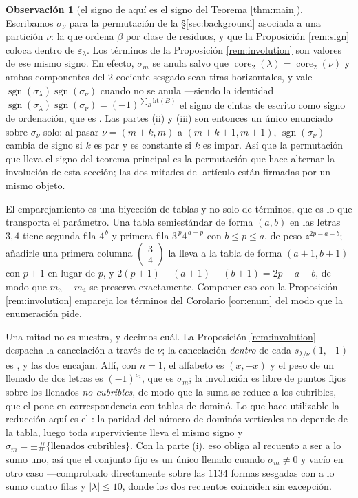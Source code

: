 \documentclass[11pt,reqno]{amsart}
\theoremstyle{plain}
\theoremstyle{definition}
\newtheorem{remark}[theorem]{Observación}
\newcommand{\sgn}{\operatorname{sgn}}
\newcommand{\core}{\operatorname{core}}
\begin{document}
\begin{remark}[el signo de aquí es el signo del Teorema \ref{thm:main}]\label{rem:onesign}
Escribamos $\sigma_\nu$ para la permutación de la \S\ref{sec:background} asociada a una partición
$\nu$: la que ordena $\beta$ por clase de residuos, y que la Proposición \ref{rem:sign} coloca
dentro de $\varepsilon_\lambda$. Los términos de la Proposición \ref{rem:involution} son valores de
ese mismo signo. En efecto, $\sigma_m$ se anula salvo que $\core_2(\lambda)=\core_2(\nu)$ y ambas
componentes del $2$-cociente sesgado sean tiras horizontales, y vale
$\sgn(\sigma_\lambda)\sgn(\sigma_\nu)$ cuando no se anula ---siendo la identidad
$\sgn(\sigma_\lambda)\sgn(\sigma_\nu)=(-1)^{\sum_B\mathrm{ht}(B)}$ el signo de cintas de
\cite[p.~91]{Mac95} escrito como signo de ordenación, que es
\cite[Lema 6.3]{KumariThesis}. Las partes {\rm(ii)} y {\rm(iii)} son
entonces un único enunciado sobre $\sigma_\nu$ solo: al pasar $\nu=(m+k,m)$ a $(m+k+1,m+1)$,
$\sgn(\sigma_\nu)$ cambia de signo si $k$ es par y es constante si $k$ es impar. Así que la
permutación que lleva el signo del teorema principal es la permutación que hace alternar la
involución de esta sección; las dos mitades del artículo están firmadas por un mismo objeto.
\end{remark}

El emparejamiento es una biyección de tablas y no solo de términos, que es lo que transporta el
parámetro. Una tabla semiestándar de forma $(a,b)$ en las letras $3,4$ tiene segunda fila $4^{\,b}$
y primera fila $3^{\,p}4^{\,a-p}$ con $b\le p\le a$, de peso $z^{2p-a-b}$; añadirle una primera
columna $\left(\begin{smallmatrix}3\\4\end{smallmatrix}\right)$ la lleva a la tabla de forma
$(a+1,b+1)$ con $p+1$ en lugar de $p$, y $2(p+1)-(a+1)-(b+1)=2p-a-b$, de modo que $m_3-m_4$ se
preserva exactamente. Componer eso con la Proposición \ref{rem:involution} empareja los términos del
Corolario \ref{cor:enum} del modo que la enumeración pide.

Una mitad no es nuestra, y decimos cuál. La Proposición \ref{rem:involution} despacha la cancelación
a través de $\nu$; la cancelación \emph{dentro} de cada $s_{\lambda/\nu}(1,-1)$ es
\cite{KumariThesis}, y las dos encajan. Allí, con $n=1$, el alfabeto es $(x,-x)$ y el peso de un
llenado de dos letras es $(-1)^{c_2}$, que es $\sigma_m$; la involución
\cite[Lema 2.18]{KumariThesis} es libre de puntos fijos sobre los llenados \emph{no cubribles}, de
modo que la suma se reduce a los cubribles, que el \cite[Lema 2.16]{KumariThesis} pone en
correspondencia con tablas de dominó. Lo que hace utilizable la reducción aquí es el
\cite[Lema 2.14]{KumariThesis}: la paridad del número de dominós verticales no depende de la tabla,
luego toda superviviente lleva el mismo signo y $\sigma_m=\pm\#\{\text{llenados cubribles}\}$. Con la
parte (i), eso obliga al recuento a ser a lo sumo uno, así que el conjunto fijo es un único llenado
cuando $\sigma_m\ne0$ y vacío en otro caso ---comprobado directamente sobre las $1134$ formas
sesgadas con a lo sumo cuatro filas y $|\lambda|\le10$, donde los dos recuentos coinciden sin
excepción.
\end{document}
